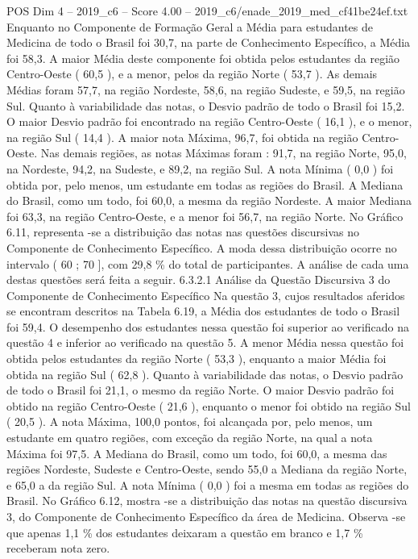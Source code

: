 \begin{textsample}{POS Dim 4 – 2019\_c6 – Score 4.00 – 2019\_c6/enade\_2019\_med\_cf41be24ef.txt}
Enquanto no Componente de Formação Geral a Média para estudantes de Medicina de todo o Brasil foi 30,7, na parte de Conhecimento Específico, a Média foi 58,3.
A maior Média deste componente foi obtida pelos estudantes da região Centro-Oeste ( 60,5 ), e a menor, pelos da região Norte ( 53,7 ).
As demais Médias foram 57,7, na região Nordeste, 58,6, na região Sudeste, e 59,5, na região Sul.
Quanto à variabilidade das notas, o Desvio padrão de todo o Brasil foi 15,2.
O maior Desvio padrão foi encontrado na região Centro-Oeste ( 16,1 ), e o menor, na região Sul ( 14,4 ).
A maior nota Máxima, 96,7, foi obtida na região Centro-Oeste.
Nas demais regiões, as notas Máximas foram : 91,7, na região Norte, 95,0, na Nordeste, 94,2, na Sudeste, e 89,2, na região Sul.
A nota Mínima ( 0,0 ) foi obtida por, pelo menos, um estudante em todas as regiões do Brasil.
A Mediana do Brasil, como um todo, foi 60,0, a mesma da região Nordeste.
A maior Mediana foi 63,3, na região Centro-Oeste, e a menor foi 56,7, na região Norte.
No Gráfico 6.11, representa -se a distribuição das notas nas questões discursivas no Componente de Conhecimento Específico.
A moda dessa distribuição ocorre no intervalo ( 60 ; 70 ], com 29,8 \% do total de participantes.
A análise de cada uma destas questões será feita a seguir. 6.3.2.1 Análise da Questão Discursiva 3 do Componente de Conhecimento Específico Na questão 3, cujos resultados aferidos se encontram descritos na Tabela 6.19, a Média dos estudantes de todo o Brasil foi 59,4.
O desempenho dos estudantes nessa questão foi superior ao verificado na questão 4 e inferior ao verificado na questão 5.
A menor Média nessa questão foi obtida pelos estudantes da região Norte ( 53,3 ), enquanto a maior Média foi obtida na região Sul ( 62,8 ).
Quanto à variabilidade das notas, o Desvio padrão de todo o Brasil foi 21,1, o mesmo da região Norte.
O maior Desvio padrão foi obtido na região Centro-Oeste ( 21,6 ), enquanto o menor foi obtido na região Sul ( 20,5 ).
A nota Máxima, 100,0 pontos, foi alcançada por, pelo menos, um estudante em quatro regiões, com exceção da região Norte, na qual a nota Máxima foi 97,5.
A Mediana do Brasil, como um todo, foi 60,0, a mesma das regiões Nordeste, Sudeste e Centro-Oeste, sendo 55,0 a Mediana da região Norte, e 65,0 a da região Sul.
A nota Mínima ( 0,0 ) foi a mesma em todas as regiões do Brasil.
No Gráfico 6.12, mostra -se a distribuição das notas na questão discursiva 3, do Componente de Conhecimento Específico da área de Medicina.
Observa -se que apenas 1,1 \% dos estudantes deixaram a questão em branco e 1,7 \% receberam nota zero.

\end{textsample}
